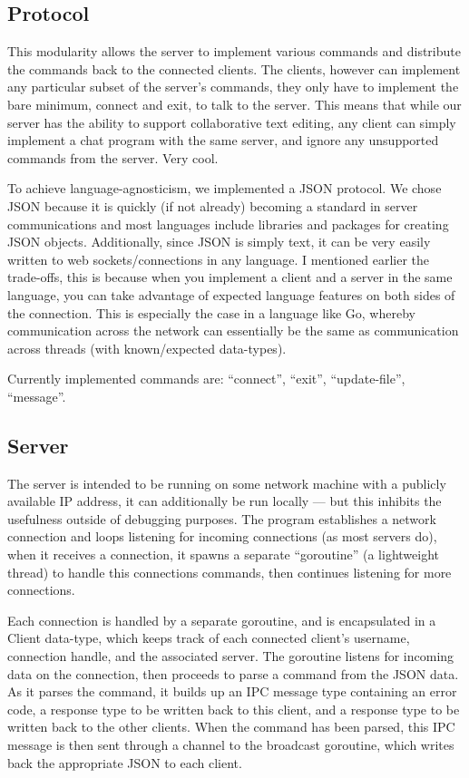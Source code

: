 \documentclass[10pt, letterpaper]{article}
\begin{document}
\subsection*{Protocol}

This modularity allows the server to implement various commands and 
distribute the commands back to the connected clients. The clients, 
however can implement any particular subset of the server's commands, 
they only have to implement the bare minimum, connect and exit, to talk 
to the server. This means that while our server has the ability to 
support collaborative text editing, any client can simply implement a 
chat program with the same server, and ignore any unsupported commands 
from the server. Very cool.

To achieve language-agnosticism, we implemented a JSON protocol. We 
chose JSON because it is quickly (if not already) becoming a standard 
in server communications and most languages include libraries and 
packages for creating JSON objects. Additionally, since JSON is simply 
text, it can be very easily written to web sockets/connections in any 
language. I mentioned earlier the trade-offs, this is because when you 
implement a client and a server in the same language, you can take 
advantage of expected language features on both sides of the 
connection. This is especially the case in a language like Go, whereby 
communication across the network can essentially be the same as 
communication across threads (with known/expected data-types).

Currently implemented commands are: ``connect'', ``exit'', 
``update-file'', ``message''.

\subsection*{Server}

The server is intended to be running on some network machine with a 
publicly available IP address, it can additionally be run locally --- 
but this inhibits the usefulness outside of debugging purposes. The 
program establishes a network connection and loops listening for 
incoming connections (as most servers do), when it receives a 
connection, it spawns a separate ``goroutine'' (a lightweight thread) 
to handle this connections commands, then continues listening for more 
connections.

Each connection is handled by a separate goroutine, and is encapsulated 
in a Client data-type, which keeps track of each connected client's 
username, connection handle, and the associated server. The goroutine 
listens for incoming data on the connection, then proceeds to parse a 
command from the JSON data. As it parses the command, it builds up an 
IPC message type containing an error code, a response type to be 
written back to this client, and a response type to be written back to 
the other clients. When the command has been parsed, this IPC message 
is then sent through a channel to the broadcast goroutine, which writes 
back the appropriate JSON to each client.
\end{document}
